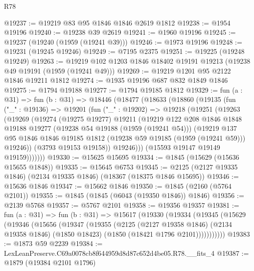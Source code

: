 \begin{lexlean}{R78}
\begin{coremodule}
@19237 := @19219 @83 @95 @1846 @1846 @2619 @1812
@19238 := @1954 @19196
@19240 := @19238 @39 @2619
@19241 := @1960 @19196
@19245 := @19237 (@19240 (@1959 (@19241 @39)))
@19246 := @1973 @19196
@19248 := @19231 (@19245 @19246)
@19249 := @7195 @2375
@19251 := @19225 (@19248 @19249)
@19263 := @19219 @102 @1203 @1846 @18402 @19191 @19213 (@19238 @49 @19191 (@1959 (@19241 @49)))
@19269 := @19219 @1201 @95 @2122 @1846 @19211 @1812
@19274 := @1935 @19196 @687 @832 @1849 @1846
@19275 := @1794 @19188
@19277 := @1794 @19185 @1812
@19329 := fun (a : @31) =>
  fun (b : @31) =>
  @18446
    (@18477
      (@18633
        (@18860
          (@19135
            (fun ("_" : @19136) =>
            @19201
              (fun ("_" : @19202) =>
              @19218
                (@19251
                  (@19263
                    (@19269
                      (@19274
                        (@19275 @19277)
                        @19211
                        (@19219
                          @122
                          @208
                          @1846
                          @1848
                          @19188
                          @19277
                          (@19238 @54 @19188 (@1959 (@19241 @54)))
                          (@19219
                            @137
                            @95
                            @1846
                            @1846
                            @19185
                            @1812
                            (@19238 @59 @19185 (@1959 (@19241 @59)))
                            @19246))
                        (@3793 @19153 @19158))
                      @19246)))
                (@15593 @19147 @19149 @19159)))))))
@19330 := @15625 @15695
@19334 := @1845 (@15629 (@15636 @15655 @1848))
@19335 := @15645 @6753
@19345 := @2125 (@2127 @19335 @1846) (@2134 @19335 @1846) (@18367 (@18375 @1846 @15695))
@19346 := @15636 @1846
@19347 := @15662 @1846
@19350 := @1845 (@2160 (@5764 @2101))
@19355 := @1845 (@1845 (@6043 (@19350 @1846)) @1846)
@19356 := @2139 @5768
@19357 := @5767 @2101
@19358 := @19356 @19357
@19381 := fun (a : @31) =>
  fun (b : @31) =>
  @15617
    (@19330
      (@19334
        (@19345
          (@15629
            (@19346
              (@15656
                (@19347
                  (@19355
                    (@2125
                      (@2127 @19358 @1846)
                      (@2134 @19358 @1846)
                      (@1850 @18423)
                      (@1850 (@18421 @1796 @2101)))))))))))
@19383 := @1873 @59 @2239
@19384 := LexLeanPreserve.C69a0078cb8f644959d8d87c652d4be05.R78.__fits_4
@19387 := @1879 (@19384 @2101 @1796)

\end{coremodule}
\end{lexlean}
